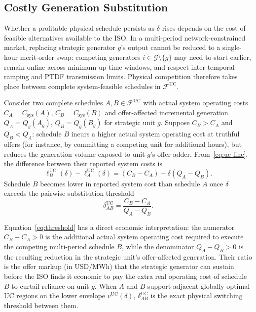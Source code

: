 \documentclass[journal]{IEEEtran}
\newcommand{\UC}{\mathrm{UC}}
\begin{document}
\subsection{Costly Generation Substitution}

Whether a profitable physical schedule persists as $\delta$ rises depends on the cost of feasible alternatives available to the ISO. In a multi-period network-constrained market, replacing strategic generator $g$'s output cannot be reduced to a single-hour merit-order swap: competing generators $i\in\mathcal{G}\setminus\{g\}$ may need to start earlier, remain online across minimum up-time windows, and respect inter-temporal ramping and PTDF transmission limits. Physical competition therefore takes place between complete system-feasible schedules in $\mathcal{F}^{\UC}$.

Consider two complete schedules $A,B\in\mathcal{F}^{\UC}$ with actual system operating costs $C_A=C_{\mathrm{sys}}(A)$, $C_B=C_{\mathrm{sys}}(B)$ and offer-affected incremental generation $Q_A=Q_g(A_g)$, $Q_B=Q_g(B_g)$ for strategic unit $g$. Suppose $C_B>C_A$ and $Q_B<Q_A$: schedule $B$ incurs a higher actual system operating cost at truthful offers (for instance, by committing a competing unit for additional hours), but reduces the generation volume exposed to unit $g$'s offer adder. From~\eqref{eq:uc-line}, the difference between their reported system costs is
\begin{equation}
\ell_B^{\UC}(\delta) - \ell_A^{\UC}(\delta)
= (C_B - C_A) - \delta(Q_A - Q_B).\label{eq:substitution-comparison}
\end{equation}
Schedule $B$ becomes lower in reported system cost than schedule $A$ once $\delta$ exceeds the pairwise substitution threshold
\begin{equation}
\delta_{AB}^{\UC} = \frac{C_B - C_A}{Q_A - Q_B}.\label{eq:threshold}
\end{equation}

Equation~\eqref{eq:threshold} has a direct economic interpretation: the numerator $C_B-C_A>0$ is the additional actual system operating cost required to execute the competing multi-period schedule $B$, while the denominator $Q_A-Q_B>0$ is the resulting reduction in the strategic unit's offer-affected generation. Their ratio is the offer markup (in USD/MWh) that the strategic generator can sustain before the ISO finds it economic to pay the extra real operating cost of schedule $B$ to curtail reliance on unit $g$. When $A$ and $B$ support adjacent globally optimal UC regions on the lower envelope $v^{\UC}(\delta)$, $\delta_{AB}^{\UC}$ is the exact physical switching threshold between them.
\end{document}
